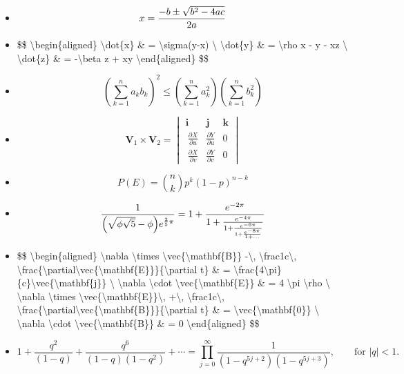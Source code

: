 \begin{itemize}
\item $$x = {-b \pm \sqrt{b^2-4ac} \over 2a}$$

\item \$\$
\textbackslash{}begin\{aligned\}
\textbackslash{}dot\{x\} \& = \textbackslash{}sigma(y-x) \textbackslash{}
\textbackslash{}dot\{y\} \& = \textbackslash{}rho x - y - xz \textbackslash{}
\textbackslash{}dot\{z\} \& = -\textbackslash{}beta z + xy
\textbackslash{}end\{aligned\}
\$\$

\item $$\left( \sum_{k=1}^n a_k b_k \right)^2 \leq \left( \sum_{k=1}^n a_k^2 \right) \left( \sum_{k=1}^n b_k^2 \right)$$

\item $$\mathbf{V}_1 \times \mathbf{V}_2 =  \begin{vmatrix}
\mathbf{i} & \mathbf{j} & \mathbf{k} \\\
\frac{\partial X}{\partial u} &  \frac{\partial Y}{\partial u} & 0 \\\
\frac{\partial X}{\partial v} &  \frac{\partial Y}{\partial v} & 0
\end{vmatrix}$$

\item $$P(E) = {n \choose k} p^k (1-p)^{n-k}$$

\item $$\frac{1}{\Bigl(\sqrt{\phi \sqrt{5}}-\phi\Bigr) e^{\frac25 \pi}} =
1+\frac{e^{-2\pi}} {1+\frac{e^{-4\pi}} {1+\frac{e^{-6\pi}}
{1+\frac{e^{-8\pi}} {1+\ldots} } } }$$

\item \$\$
\textbackslash{}begin\{aligned\}
\textbackslash{}nabla \textbackslash{}times \textbackslash{}vec\{\textbackslash{}mathbf\{B\}\} -\textbackslash{}, \textbackslash{}frac1c\textbackslash{}, \textbackslash{}frac\{\textbackslash{}partial\textbackslash{}vec\{\textbackslash{}mathbf\{E\}\}\}\{\textbackslash{}partial t\} \& = \textbackslash{}frac\{4\textbackslash{}pi\}\{c\}\textbackslash{}vec\{\textbackslash{}mathbf\{j\}\} \textbackslash{}
\textbackslash{}nabla \textbackslash{}cdot \textbackslash{}vec\{\textbackslash{}mathbf\{E\}\} \& = 4 \textbackslash{}pi \textbackslash{}rho \textbackslash{}
\textbackslash{}nabla \textbackslash{}times \textbackslash{}vec\{\textbackslash{}mathbf\{E\}\}\textbackslash{}, +\textbackslash{}, \textbackslash{}frac1c\textbackslash{}, \textbackslash{}frac\{\textbackslash{}partial\textbackslash{}vec\{\textbackslash{}mathbf\{B\}\}\}\{\textbackslash{}partial t\} \& = \textbackslash{}vec\{\textbackslash{}mathbf\{0\}\} \textbackslash{}
\textbackslash{}nabla \textbackslash{}cdot \textbackslash{}vec\{\textbackslash{}mathbf\{B\}\} \& = 0 \textbackslash{}end\{aligned\}
\$\$

\item $$1 +  \frac{q^2}{(1-q)}+\frac{q^6}{(1-q)(1-q^2)}+\cdots =
\prod_{j=0}^{\infty}\frac{1}{(1-q^{5j+2})(1-q^{5j+3})},
\quad\quad \text{for $|q|<1$}.$$

\end{itemize}

